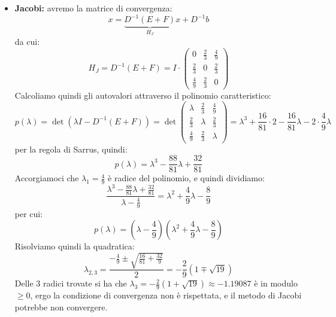 \documentclass[a4paper,11pt]{article}
\begin{document}
\begin{itemize}
	\item \textbf{Jacobi:} avremo la matrice di convergenza:
$$
x = \underbrace{D^{-1}(E + F)}_{H_J} x + D^{-1} b
$$
da cui:
$$
H_J = D^{-1}(E + F) = I \cdot \begin{pmatrix}
	0 & \frac{2}{3} & \frac{4}{9} \\
	\frac{2}{3} & 0 & \frac{2}{3} \\ 
	\frac{4}{9} & \frac{2}{3} & 0
\end{pmatrix}
$$
Calcoliamo quindi gli autovalori attraverso il polinomio caratteristico:
$$
p(\lambda) = \det \left( \lambda I - D^{-1} (E + F) \right) = \det \begin{pmatrix}
	\lambda & \frac{2}{3} & \frac{4}{9} \\
	\frac{2}{3} & \lambda & \frac{2}{3} \\ 
	\frac{4}{9} & \frac{2}{3} & \lambda
\end{pmatrix} = \lambda^3 + \frac{16}{81} \cdot 2 - \frac{16}{81} \lambda - 2 \cdot \frac{4}{9} \lambda
$$
per la regola di Sarrus, quindi:
$$
p(\lambda) = \lambda^3 - \frac{88}{81} \lambda + \frac{32}{81}
$$
Accorgiamoci che $\lambda_1 = \frac{4}{9}$ è radice del polinomio, e quindi dividiamo:
$$
\frac{ \lambda^3 - \frac{88}{81} \lambda + \frac{32}{81}}{\lambda - \frac{4}{9}} = \lambda^2 + \frac{4}{9} \lambda - \frac{8}{9} 
$$
per cui:
$$
p(\lambda) = \left( \lambda - \frac{4}{9} \right) \left( \lambda^2 + \frac{4}{9} \lambda - \frac{8}{9} \right)
$$
Risolviamo quindi la quadratica:
$$
\lambda_{2, 3} = \frac{-\frac{4}{9} \pm \sqrt{ \frac{16}{81} + \frac{32}{9} }}{2} = -\frac{2}{9} \left( 1 \mp \sqrt{19} \right)
$$
Delle 3 radici trovate si ha che $\lambda_3 = -\frac{2}{9} \left( 1 + \sqrt{19} \right) \approx - 1.19087$ è in modulo $\geq 0$, ergo la condizione di convergenza non è rispettata, e il metodo di Jacobi potrebbe non convergere.


\end{itemize}
\end{document}
